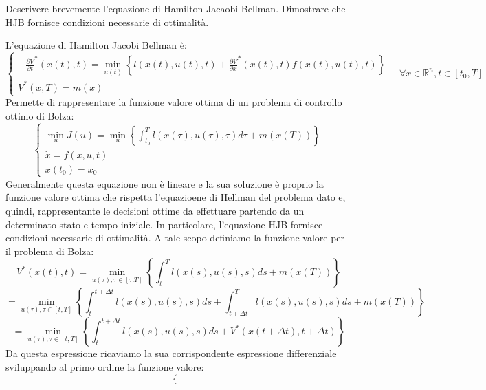 \documentclass{article}
\begin{document}
{}
\begin{question*}
  Descrivere brevemente l'equazione di Hamilton-Jacaobi Bellman. Dimostrare
  che HJB fornisce condizioni necessarie di ottimalit{\`a}.
\end{question*}

\begin{answer*}
  L'equazione di Hamilton Jacobi Bellman {\`e}:
  \[ \left\{\begin{array}{l}
       - \frac{\partial V}{\partial t}^{\ast} (x (t), t) = \min_{u (t)}
       \left\{ l (x (t), u (t), t) + \frac{\partial V}{\partial x}^{\ast} (x
       (t), t) f (x (t), u (t), t) \right\}\\
       V^{\ast} (x, T) = m (x)
     \end{array}\right. \quad \forall x \in \mathbb{R}^n, t \in [t_0, T] \]
  Permette di rappresentare la funzione valore ottima di un problema di
  controllo ottimo di Bolza:
  \[ \left\{\begin{array}{l}
       \min_u J (u) = \min_u \left\{ \int_{t_0}^T l (x (\tau), u (\tau), \tau)
       d \tau + m (x (T)) \right\}\\
       \dot{x} = f (x, u, t)\\
       x (t_0) = x_0
     \end{array}\right. \]
  Generalmente questa equazione non {\`e} lineare e la sua soluzione {\`e}
  proprio la funzione valore ottima che rispetta l'equazioene di Hellman del
  problema dato e, quindi, rappresentante le decisioni ottime da effettuare
  partendo da un determinato stato e tempo iniziale. In particolare,
  l'equazione HJB fornisce condizioni necessarie di ottimalit{\`a}. A tale
  scopo definiamo la funzione valore per il problema di Bolza:
  \[ V^{\ast} (x (t), t) = \min_{u (\tau), \tau \in [\tau .T]} \left\{
     \int_t^T l (x (s), u (s), s) d s + m (x (T)) \right\} \]
  \[ = \min_{u (\tau), \tau \in [t, T]} \left\{ \int_t^{t + \Delta t} l (x
     (s), u (s), s) d s + \int_{t + \Delta t}^T l (x (s), u (s), s) d s + m (x
     (T)) \right\} \]
  \[ = \min_{u (\tau), \tau \in [t, T]} \left\{ \int_t^{t + \Delta t} l (x
     (s), u (s), s) d s + V^{\ast} (x (t + \Delta t), t + \Delta t) \right\}
  \]
  Da questa espressione ricaviamo la sua corrispondente espressione
  differenziale sviluppando al primo ordine la funzione valore:
  \[ \left\{\begin{array}{l}

\end{array}\]
\end{answer*}
\end{document}
